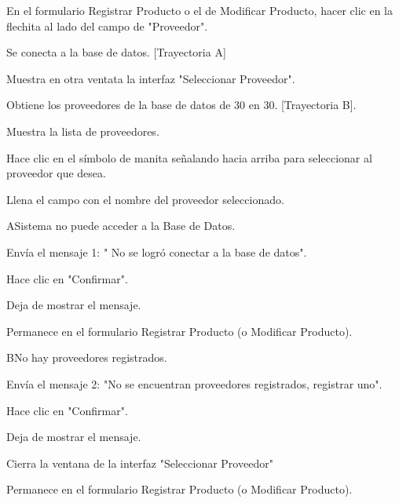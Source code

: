 \begin{UCtrayectoria}
	
	\UCpaso[\UCactor] En el formulario Registrar Producto o el de Modificar Producto, hacer clic en la flechita al lado del campo de "Proveedor".
	
	\UCpaso[\UCsist] Se conecta a la base de datos. [Trayectoria A]

	\UCpaso[\UCsist] Muestra en otra ventata la interfaz "Seleccionar Proveedor".

	\UCpaso[\UCsist] Obtiene los proveedores de la base de datos de 30 en 30.  [Trayectoria B].

	\UCpaso[\UCsist] Muestra la lista de proveedores.

	\UCpaso[\UCactor] Hace clic en el símbolo de manita señalando hacia arriba para seleccionar al proveedor que desea.

	\UCpaso[\UCsist] Llena el campo con el nombre del proveedor seleccionado.
	
\end{UCtrayectoria}

\begin{UCtrayectoriaA}{A}{Sistema no puede acceder a la Base de Datos.}
	
	\UCpaso[\UCsist] Envía el mensaje 1: " No se logró conectar a la base de datos".
	
	\UCpaso[\UCactor] Hace clic en "Confirmar".

	\UCpaso[\UCsist] Deja de mostrar el mensaje.

	\UCpaso[]  Permanece en el formulario Registrar Producto (o Modificar Producto).

\end{UCtrayectoriaA}

\begin{UCtrayectoriaA}{B}{No hay proveedores registrados.}
	
	\UCpaso[\UCsist] Envía el mensaje 2: "No se encuentran proveedores registrados, registrar uno".

	\UCpaso[\UCactor] Hace clic en "Confirmar".

	\UCpaso[\UCsist] Deja de mostrar el mensaje.

	\UCpaso[\UCsist] Cierra la ventana de la interfaz "Seleccionar Proveedor"

	\UCpaso[]  Permanece en el formulario Registrar Producto (o Modificar Producto).

\end{UCtrayectoriaA}